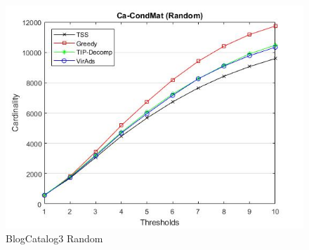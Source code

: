 \begin{figure}
	\centering	
	\includegraphics[scale=0.5]{images/ca-condmatresultrandom.jpg}
	\caption{BlogCatalog3 Random}
\end{figure}

